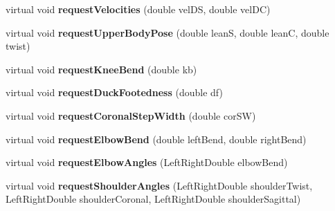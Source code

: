 \begin{DoxyCompactItemize}
\item 
\hypertarget{classCartWheel_1_1Core_1_1BehaviourController_a1f7424cd15d81234c2ab754a1c8cb3ab}{
virtual void {\bfseries requestVelocities} (double velDS, double velDC)}
\label{classCartWheel_1_1Core_1_1BehaviourController_a1f7424cd15d81234c2ab754a1c8cb3ab}

\item 
\hypertarget{classCartWheel_1_1Core_1_1BehaviourController_ad7973e7386b987b963d6b80275f14976}{
virtual void {\bfseries requestUpperBodyPose} (double leanS, double leanC, double twist)}
\label{classCartWheel_1_1Core_1_1BehaviourController_ad7973e7386b987b963d6b80275f14976}

\item 
\hypertarget{classCartWheel_1_1Core_1_1BehaviourController_a4dc46a1003cc57b70bf9b2e3c1100091}{
virtual void {\bfseries requestKneeBend} (double kb)}
\label{classCartWheel_1_1Core_1_1BehaviourController_a4dc46a1003cc57b70bf9b2e3c1100091}

\item 
\hypertarget{classCartWheel_1_1Core_1_1BehaviourController_aa2bdd5413ab4f86373d785d02c9f44e5}{
virtual void {\bfseries requestDuckFootedness} (double df)}
\label{classCartWheel_1_1Core_1_1BehaviourController_aa2bdd5413ab4f86373d785d02c9f44e5}

\item 
\hypertarget{classCartWheel_1_1Core_1_1BehaviourController_a6aaf83b9a7f59108df6fb08dcd018e89}{
virtual void {\bfseries requestCoronalStepWidth} (double corSW)}
\label{classCartWheel_1_1Core_1_1BehaviourController_a6aaf83b9a7f59108df6fb08dcd018e89}

\item 
\hypertarget{classCartWheel_1_1Core_1_1BehaviourController_ad9700ed8f593e98d7dcc8b9b333cae89}{
virtual void {\bfseries requestElbowBend} (double leftBend, double rightBend)}
\label{classCartWheel_1_1Core_1_1BehaviourController_ad9700ed8f593e98d7dcc8b9b333cae89}

\item 
\hypertarget{classCartWheel_1_1Core_1_1BehaviourController_a6e18cc0c44d5497a565b03c72b4ccb82}{
virtual void {\bfseries requestElbowAngles} (LeftRightDouble elbowBend)}
\label{classCartWheel_1_1Core_1_1BehaviourController_a6e18cc0c44d5497a565b03c72b4ccb82}

\item 
\hypertarget{classCartWheel_1_1Core_1_1BehaviourController_ab6f34e46ccd80f5aa5609dbc34977432}{
virtual void {\bfseries requestShoulderAngles} (LeftRightDouble shoulderTwist, LeftRightDouble shoulderCoronal, LeftRightDouble shoulderSagittal)}
\label{classCartWheel_1_1Core_1_1BehaviourController_ab6f34e46ccd80f5aa5609dbc34977432}


\end{DoxyCompactItemize}
